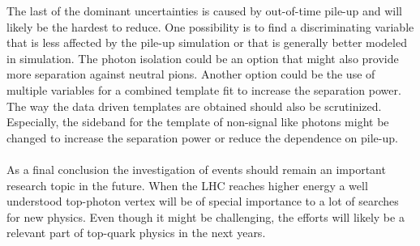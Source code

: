 The last of the dominant uncertainties is caused by out-of-time pile-up and will likely be the hardest to reduce. One possibility is to find a discriminating variable that is less affected by the pile-up simulation or that is generally better modeled in simulation. The photon isolation could be an option that might also provide more separation against neutral pions. Another option could be the use of multiple variables for a combined template fit to increase the separation power. The way the data driven templates are obtained should also be scrutinized. Especially, the sideband for the template of non-signal like photons might be changed to increase the separation power or reduce the dependence on pile-up. \\
\\
As a final conclusion the investigation of \ttgamma events should remain an important research topic in the future. When the LHC reaches higher energy a well understood top-photon vertex will be of special importance to a lot of searches for new physics. Even though it might be challenging, the efforts will likely be a relevant part of top-quark physics in the next years.\enlargethispage{\baselineskip} \\